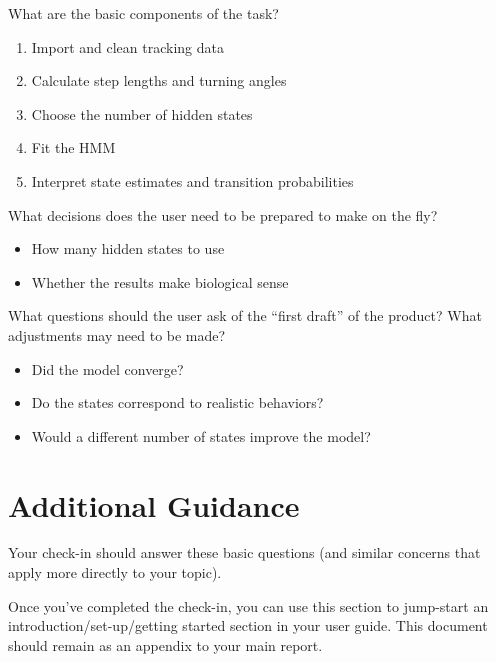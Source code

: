 \documentclass[
  letterpaper,
  DIV=11,
  numbers=noendperiod]{scrreprt}
\providecommand{\tightlist}{%
  \setlength{\itemsep}{0pt}\setlength{\parskip}{0pt}}
\begin{document}
What are the basic components of the task?

\begin{enumerate}
\def\labelenumi{\arabic{enumi}.}
\tightlist
\item
  Import and clean tracking data\\
\item
  Calculate step lengths and turning angles\\
\item
  Choose the number of hidden states\\
\item
  Fit the HMM\\
\item
  Interpret state estimates and transition probabilities
\end{enumerate}

What decisions does the user need to be prepared to make on the fly?

\begin{itemize}
\tightlist
\item
  How many hidden states to use
\item
  Whether the results make biological sense
\end{itemize}

What questions should the user ask of the ``first draft'' of the
product? What adjustments may need to be made?

\begin{itemize}
\tightlist
\item
  Did the model converge?
\item
  Do the states correspond to realistic behaviors?
\item
  Would a different number of states improve the model?
\end{itemize}

\section{Additional Guidance}\label{additional-guidance}

Your check-in should answer these basic questions (and similar concerns
that apply more directly to your topic).

Once you've completed the check-in, you can use this section to
jump-start an introduction/set-up/getting started section in your user
guide. This document should remain as an appendix to your main report.
\end{document}
